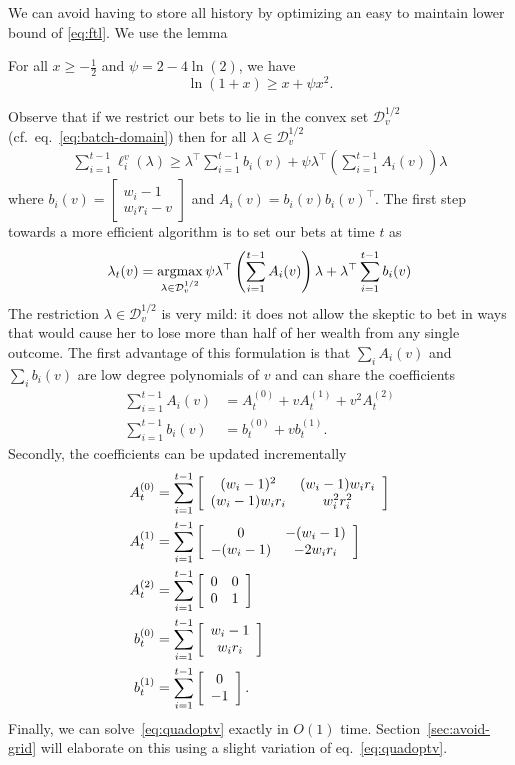 We can avoid having to store all history by optimizing
an easy to maintain lower bound of \eqref{eq:ftl}.
We use the lemma
\begin{lemma} 
\label{lem:quadbound}
For all $x\geq -\frac{1}{2}$ and $\psi=2-4\ln(2)$, we have
\[
\ln(1+x)\geq x + \psi x^2.
\]
\end{lemma}
Observe that if we restrict our bets to lie in the convex set
$\mathcal{D}_v^{1/2}$ (cf.~eq.~\eqref{eq:batch-domain})
then for all $\lambda \in \mathcal{D}_v^{1/2}$
\begin{align*}
\sum_{i=1}^{t-1} \ell_i^v(\lambda) 
\geq
\lambda^\top \sum_{i=1}^{t-1} b_i(v) 
+\psi \lambda^\top \left(\sum_{i=1}^{t-1} A_i(v)\right) \lambda
\end{align*}
where 
$b_i(v)=
\left[\begin{array}{c} 
w_i-1 \\ w_i r_i -v 
\end{array}\right] 
$
and 
$
A_i(v) = b_i(v)b_i(v)^\top.
$
The first step towards a more efficient algorithm is to 
set our bets at time $t$ as
\begin{equation}
\lambda_t(v) = \operatorname*{argmax}_{\lambda \in \mathcal{D}_{v}^{1/2}}
\psi  \lambda^\top \left(\sum_{i=1}^{t-1} A_i(v)\right) \lambda 
+ \lambda^\top \sum_{i=1}^{t-1} b_i(v)
\label{eq:quadoptv}
\end{equation}
The restriction $\lambda \in \mathcal{D}_{v}^{1/2}$ 
is very mild: it does 
not allow the skeptic to bet in ways that would cause her 
to lose more than half of her wealth from any single outcome.
The first advantage of this formulation is that 
$\sum_i A_i(v)$ and $\sum_i b_i(v)$ are low degree 
polynomials of $v$ and can share the coefficients
    \begin{align*}
        \sum_{i=1}^{t-1} A_i(v) &= 
        A_t^{(0)} + v A_t^{(1)} + v^2 A_t^{(2)}\\   
        \sum_{i=1}^{t-1} b_i(v) &= b_t^{(0)} + v b_t^{(1)}.  
    \end{align*}
Secondly, the coefficients can be updated incrementally
    \begin{align}
        A_t^{(0)} &=\sum_{i=1}^{t-1}\left[\begin{array}{cc} (w_i-1)^2 & (w_i-1)w_i r_i \\ (w_i-1)w_i r_i & w_i^2r_i^2 \end{array}\right] \label{eq:upsuffa0}\\
        A_t^{(1)} &= \sum_{i=1}^{t-1} \left[\begin{array}{cc} 0 & -(w_i-1) \\ -(w_i-1) & -2w_ir_i \end{array}\right]\\
        A_t^{(2)} &=\sum_{i=1}^{t-1}  \left[\begin{array}{cc} 0 & 0 \\ 0 & 1 \end{array}\right]\\
        b_t^{(0)} &=\sum_{i=1}^{t-1}  \left[\begin{array}{c} w_i-1 \\ w_ir_i \end{array}\right]\\
        b_t^{(1)} &=\sum_{i=1}^{t-1}  \left[\begin{array}{c} 0 \\ -1 \end{array}\right]. \label{eq:upsuffb1}
    \end{align}
Finally, we can solve~\eqref{eq:quadoptv} exactly in $O(1)$ time. 
Section~\ref{sec:avoid-grid} will elaborate on this using 
a slight variation of eq.~\eqref{eq:quadoptv}.


